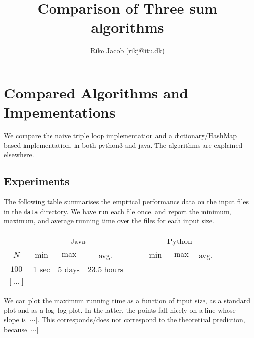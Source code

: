 \documentclass[nobib]{tufte-handout}
\title{Comparison of Three sum algorithms}
\author{Riko Jacob (rikj@itu.dk)}
\begin{document}
\maketitle

\section{Compared Algorithms and Impementations}

We compare the naive triple loop implementation and a dictionary/HashMap based implementation, in both python3 and java.
The algorithms are explained elsewhere.
 

\subsection{Experiments}

The following table summarises the empirical performance data on the input files in the \texttt{data} directory.
We have run each file once, and report the minimum, maximum, and average running time over the files for each input size.

  \bigskip\noindent
{ \small
  \begin{tabular}{cccccccc}
  \toprule
& \multicolumn{3}{c}{Java} & $\quad$ & \multicolumn{3}{c}{Python}  \\\cmidrule{2-4} \cmidrule{6-8}
  $N$     & $\min$     & $\max$ & avg. &
          & $\min$     & $\max$ & avg.   \\\midrule
  $100	$ & 1 sec & 5 days & 23.5 hours \\
  $[\ldots]$ \\
  \bottomrule
  \end{tabular}
}

\medskip
We can plot the maximum running time as a function of input size, as a standard plot and as a log--log plot.
In the latter, the points fall nicely on a line whose slope is [$\cdots$].
This corresponds/does not correspond to the theoretical prediction, because [$\cdots$]
\medskip
\end{document}
